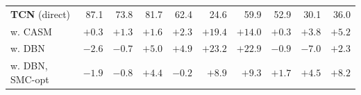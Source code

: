 \documentclass{article}
\begin{document}
\begin{table}[t]
{\begin{tabular}{l|rrr|rrr|rrr}
\midrule
\textbf{TCN} (direct) \cite{bock2020deconstruct}
& 87.1 & 73.8 & 81.7
& 62.4 & 24.6 & 59.9
& 52.9 & 30.1 & 36.0 \\
\rowcolor{gray!10}
\quad w. CASM
& $\mathbf{+0.3}$ & $\mathbf{+1.3}$ & $+1.6$
& $+2.3$ & $+19.4$ & $+14.0$
& $+0.3$ & $+3.8$ & $+5.2$ \\
\quad w. DBN
& $-2.6$ & $-0.7$ & $\mathbf{+5.0}$
& $\mathbf{+4.9}$ & $\mathbf{+23.2}$ & $\mathbf{+22.9}$
& $-0.9$ & $-7.0$ & $+2.3$ \\
\rowcolor{gray!10}
\quad w. DBN, SMC-opt
& $-1.9$ & $-0.8$ & $+4.4$
& $-0.2$ & $+8.9$ & $+9.3$
& $\mathbf{+1.7}$ & $\mathbf{+4.5}$ & $\mathbf{+8.2}$ \\
\bottomrule
\end{tabular}%
}
\endgroup
\end{table}
\end{document}
